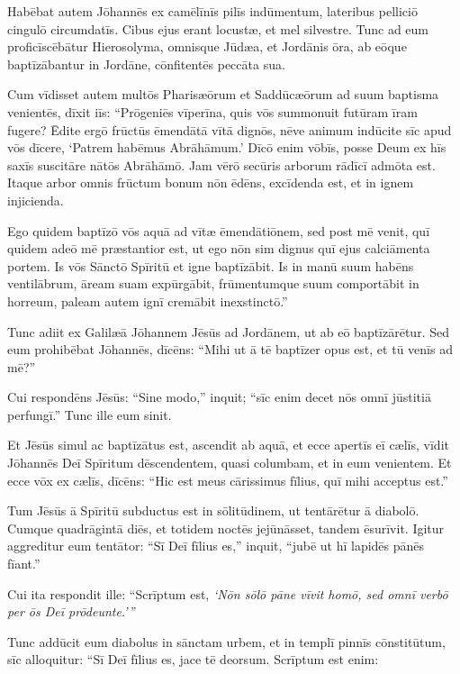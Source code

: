 \Versus Habēbat autem Jōhannēs ex camēlīnīs pilīs indūmentum, lateribus pelliciō cingulō circumdatīs. Cibus ejus erant locustæ, et mel silvestre. 
\Versus Tunc ad eum proficīscēbātur Hierosolyma, omnisque Jūdæa, et Jordānis ōra, 
\Versus ab eōque baptīzābantur in Jordāne, cōnfitentēs peccāta sua.

\Versus Cum vīdisset autem multōs Pharisæōrum et Saddūcæōrum ad suum baptisma venientēs, dīxit iīs: ``Prōgeniēs vīperīna, quis vōs summonuit futūram īram fugere? 
\Versus Ēdite ergō frūctūs ēmendātā vītā dignōs, 
\Versus nēve animum indūcite sīc apud vōs dīcere, `Patrem habēmus Abrāhāmum.' Dīcō enim vōbīs, posse Deum ex hīs saxīs suscitāre nātōs Abrāhāmō. 
\Versus Jam vērō secūris arborum rādīcī admōta est. Itaque arbor omnis frūctum bonum nōn ēdēns, excīdenda est, et in ignem injicienda.

\Versus Ego quidem baptīzō vōs aquā ad vītæ ēmendātiōnem, sed post mē venit, quī quidem adeō mē præstantior est, ut ego nōn sim dignus quī ejus calciāmenta portem. Is vōs Sānctō Spīritū et igne baptīzābit. 
\Versus Is in manū suum habēns ventilābrum, āream suam expūrgābit, frūmentumque suum comportābit in horreum, paleam autem ignī cremābit inexstinctō.''

\Versus Tunc adiit ex Galilæā Jōhannem Jēsūs ad Jordānem, ut ab eō baptīzārētur. 
\Versus Sed eum prohibēbat Jōhannēs, dīcēns: ``Mihi ut ā tē baptīzer opus est, et tū venīs ad mē?'' 

\Versus Cui respondēns Jēsūs: ``Sine modo,'' inquit; ``sīc enim decet nōs omnī jūstitiā perfungī.'' Tunc ille eum sinit. 

\Versus Et Jēsūs simul ac baptīzātus est, ascendit ab aquā, et ecce apertīs eī cælīs, vīdit Jōhannēs Deī Spīritum dēscendentem, quasi columbam, et in eum venientem. 
\Versus Et ecce vōx ex cælīs, dīcēns: ``Hic est meus cārissimus fīlius, quī mihi acceptus est.''
 

\Caput
\Versus Tum Jēsūs ā Spīritū subductus est in sōlitūdinem, ut tentārētur ā diabolō. 
\Versus Cumque quadrāgintā diēs, et totidem noctēs jejūnāsset, tandem ēsurīvit. 
\Versus Igitur aggreditur eum tentātor: ``Sī Deī fīlius es,'' inquit, ``jubē ut hī lapidēs pānēs fīant.'' 

\Versus Cui ita respondit ille: ``Scrīptum est, \emph{`Nōn sōlō pāne vīvit homō, sed omnī verbō per ōs Deī prōdeunte.'{}''}

\Versus Tunc addūcit eum diabolus in sānctam urbem, et in templī pinnīs cōnstitūtum, 
\Versus sīc alloquitur:
``Sī Deī fīlius es, jace tē deorsum. Scrīptum est enim:

